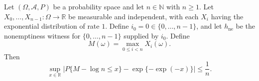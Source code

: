 \begin{theorem}
Let $(\Omega,\mathcal A,P)$ be a probability space and let
$n\in\mathbb N$ with $n\ge1$.  Let
$X_0,\ldots,X_{n-1}:\Omega\to\mathbb R$ be measurable and independent,
with each $X_i$ having the exponential distribution of rate $1$.  Define
$i_0=0\in\{0,\ldots,n-1\}$, and let $h_{\mathrm{ne}}$ be the
nonemptiness witness for $\{0,\ldots,n-1\}$ supplied by $i_0$.  Define
\[
  M(\omega)=\max_{0\le i<n}X_i(\omega).
\]
Then
\[
 \sup_{x\in\mathbb R}
 \left|
 P\{M-\log n\le x\}
 -\exp\{-\exp(-x)\}
 \right|
 \le\frac1n.
\]
\end{theorem}

